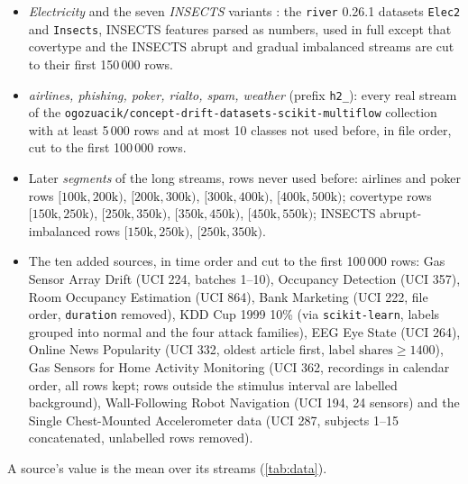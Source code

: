 \begin{itemize}
\item \emph{Electricity} and the seven \emph{INSECTS} variants \citep{souza2020insects}: the \texttt{river} 0.26.1
  datasets \texttt{Elec2} and \texttt{Insects}, INSECTS features parsed as numbers, used in full except that covertype
  and the INSECTS abrupt and gradual imbalanced streams are cut to their first 150\,000 rows. %
\item \emph{airlines, phishing, poker, rialto, spam, weather} (prefix \texttt{h2\_}): every real stream of the
  \texttt{ogozuacik/concept-drift-datasets-scikit-multiflow} collection with at least 5\,000 rows and at most 10
  classes not used before, in file order, cut to the first 100\,000 rows. %
\item Later \emph{segments} of the long streams, rows never used before: airlines and poker rows
  $[100\mathrm{k},200\mathrm{k})$, $[200\mathrm{k},300\mathrm{k})$, $[300\mathrm{k},400\mathrm{k})$,
  $[400\mathrm{k},500\mathrm{k})$; covertype rows $[150\mathrm{k},250\mathrm{k})$, $[250\mathrm{k},350\mathrm{k})$,
  $[350\mathrm{k},450\mathrm{k})$, $[450\mathrm{k},550\mathrm{k})$; INSECTS abrupt-imbalanced rows
  $[150\mathrm{k},250\mathrm{k})$, $[250\mathrm{k},350\mathrm{k})$. %
\item The ten added sources, in time order and cut to the first 100\,000 rows: Gas Sensor Array Drift (UCI 224,
  batches 1--10), Occupancy Detection (UCI 357), Room Occupancy Estimation (UCI 864), Bank Marketing (UCI 222,
  file order, \texttt{duration} removed), KDD Cup 1999 10\% (via \texttt{scikit-learn}, labels grouped into normal and
  the four attack families), EEG Eye State (UCI 264), Online News Popularity (UCI 332, oldest article first, label
  $\text{shares}\ge1400$), Gas Sensors for Home Activity Monitoring (UCI 362, recordings in calendar order, all rows kept;
  rows outside the stimulus interval are labelled background), Wall-Following Robot Navigation (UCI 194, 24 sensors) and the Single Chest-Mounted
  Accelerometer data (UCI 287, subjects 1--15 concatenated, unlabelled rows removed).
\end{itemize}
A source's value is the mean over its streams (\cref{tab:data}).

